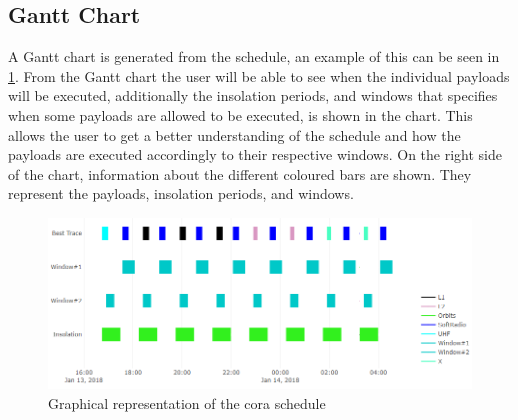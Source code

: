 \subsection{Gantt Chart} \label{subsec:gantt}
A Gantt chart is generated from the schedule, an example of this can be seen in \cref{fig:gantt}.
From the Gantt chart the user will be able to see when the individual payloads will be executed, additionally the insolation periods, and windows that specifies when some payloads are allowed to be executed, is shown in the chart. 
This allows the user to get a better understanding of the schedule and how the payloads are executed accordingly to their respective windows. 
On the right side of the chart, information about the different coloured bars are shown.
They represent the payloads, insolation periods, and windows. 
\begin{figure}[!h]
	\includegraphics[width=\textwidth]{graphics/gantt.png}
	\caption{Graphical representation of the \gls{cora} schedule}
	\label{fig:gantt}
\end{figure}
